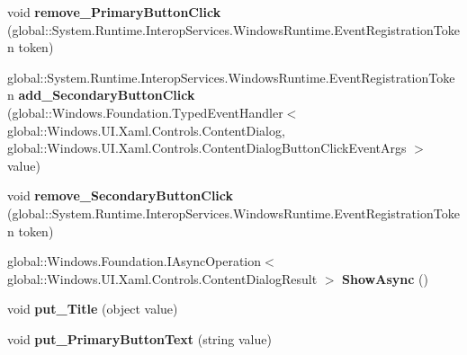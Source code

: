 \begin{DoxyCompactItemize}
\item 
\mbox{\label{interface_windows_1_1_u_i_1_1_xaml_1_1_controls_1_1_i_content_dialog_a53f3d58439fda719b2ff79bd2ff51652}} 
void {\bfseries remove\+\_\+\+Primary\+Button\+Click} (global\+::\+System.\+Runtime.\+Interop\+Services.\+Windows\+Runtime.\+Event\+Registration\+Token token)
\item 
\mbox{\label{interface_windows_1_1_u_i_1_1_xaml_1_1_controls_1_1_i_content_dialog_aabc798f8f7902cb7ff7745165632f610}} 
global\+::\+System.\+Runtime.\+Interop\+Services.\+Windows\+Runtime.\+Event\+Registration\+Token {\bfseries add\+\_\+\+Secondary\+Button\+Click} (global\+::\+Windows.\+Foundation.\+Typed\+Event\+Handler$<$ global\+::\+Windows.\+U\+I.\+Xaml.\+Controls.\+Content\+Dialog, global\+::\+Windows.\+U\+I.\+Xaml.\+Controls.\+Content\+Dialog\+Button\+Click\+Event\+Args $>$ value)
\item 
\mbox{\label{interface_windows_1_1_u_i_1_1_xaml_1_1_controls_1_1_i_content_dialog_a3174397ca2d88ef8ed1bd607efcbe4c9}} 
void {\bfseries remove\+\_\+\+Secondary\+Button\+Click} (global\+::\+System.\+Runtime.\+Interop\+Services.\+Windows\+Runtime.\+Event\+Registration\+Token token)
\item 
\mbox{\label{interface_windows_1_1_u_i_1_1_xaml_1_1_controls_1_1_i_content_dialog_a7893cebe9c1247e5e3cf46b4438e662e}} 
global\+::\+Windows.\+Foundation.\+I\+Async\+Operation$<$ global\+::\+Windows.\+U\+I.\+Xaml.\+Controls.\+Content\+Dialog\+Result $>$ {\bfseries Show\+Async} ()
\item 
\mbox{\label{interface_windows_1_1_u_i_1_1_xaml_1_1_controls_1_1_i_content_dialog_afc276f713f3e2b87b2c5dee06ae15a45}} 
void {\bfseries put\+\_\+\+Title} (object value)
\item 
\mbox{\label{interface_windows_1_1_u_i_1_1_xaml_1_1_controls_1_1_i_content_dialog_ab7dd4baecced729d7b0c3c5dd82ccc5d}} 
void {\bfseries put\+\_\+\+Primary\+Button\+Text} (string value)

\end{DoxyCompactItemize}
